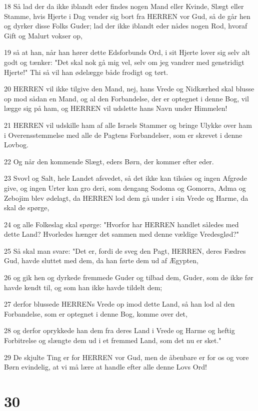 \par 18 Så lad der da ikke iblandt eder findes nogen Mand eller Kvinde, Slægt eller Stamme, hvis Hjerte i Dag vender sig bort fra HERREN vor Gud, så de går hen og dyrker disse Folks Guder; lad der ikke iblandt eder nådes nogen Rod, hvoraf Gift og Malurt vokser op,
\par 19 så at han, når han hører dette Edsforbunds Ord, i sit Hjerte lover sig selv alt godt og tænker: "Det skal nok gå mig vel, selv om jeg vandrer med genstridigt Hjerte!" Thi så vil han ødelægge både frodigt og tørt.
\par 20 HERREN vil ikke tilgive den Mand, nej, hans Vrede og Nidkærhed skal blusse op mod sådan en Mand, og al den Forbandelse, der er optegnet i denne Bog, vil lægge sig på ham, og HERREN vil udslette hans Navn under Himmelen!
\par 21 HERREN vil udskille ham af alle Israels Stammer og bringe Ulykke over ham i Overensstemmelse med alle de Pagtens Forbandelser, som er skrevet i denne Lovbog.
\par 22 Og når den kommende Slægt, eders Børn, der kommer efter eder.
\par 23 Svovl og Salt, hele Landet afsvedet, så det ikke kan tilsåes og ingen Afgrøde give, og ingen Urter kan gro deri, som dengang Sodoma og Gomorra, Adma og Zebojim blev ødelagt, da HERREN lod dem gå under i sin Vrede og Harme, da skal de spørge,
\par 24 og alle Folkeslag skal spørge: "Hvorfor har HERREN handlet således med dette Land? Hvorledes hænger det sammen med denne vældige Vredesglød?"
\par 25 Så skal man svare: "Det er, fordi de sveg den Pagt, HERREN, deres Fædres Gud, havde sluttet med dem, da han førte dem ud af Ægypten,
\par 26 og gik hen og dyrkede fremmede Guder og tilbad dem, Guder, som de ikke før havde kendt til, og som han ikke havde tildelt dem;
\par 27 derfor blussede HERRENs Vrede op imod dette Land, så han lod al den Forbandelse, som er optegnet i denne Bog, komme over det,
\par 28 og derfor oprykkede han dem fra deres Land i Vrede og Harme og heftig Forbitrelse og slængte dem ud i et fremmed Land, som det nu er sket."
\par 29 De skjulte Ting er for HERREN vor Gud, men de åbenbare er for os og vore Børn evindelig, at vi må lære at handle efter alle denne Lovs Ord!

\chapter{30}

